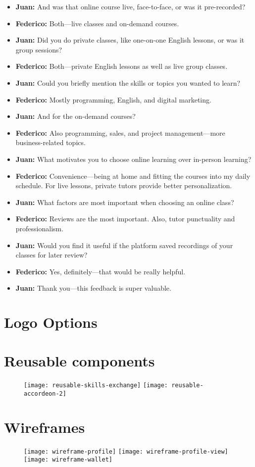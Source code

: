 \begin{enumerate}
\begin{itemize}
        \item \textbf{Juan:} And was that online course live, face-to-face, or was it pre-recorded?
        \item \textbf{Federico:} Both—live classes and on-demand courses.
        \item \textbf{Juan:} Did you do private classes, like one-on-one English lessons, or was it group sessions?
        \item \textbf{Federico:} Both—private English lessons as well as live group classes.
        \item \textbf{Juan:} Could you briefly mention the skills or topics you wanted to learn?
        \item \textbf{Federico:} Mostly programming, English, and digital marketing.
        \item \textbf{Juan:} And for the on-demand courses?
        \item \textbf{Federico:} Also programming, sales, and project management—more business-related topics.
        \item \textbf{Juan:} What motivates you to choose online learning over in-person learning?
        \item \textbf{Federico:} Convenience—being at home and fitting the courses into my daily schedule.
        For live lessons, private tutors provide better personalization.
        \item \textbf{Juan:} What factors are most important when choosing an online class?
        \item \textbf{Federico:} Reviews are the most important.
        Also, tutor punctuality and professionalism.
        \item \textbf{Juan:} Would you find it useful if the platform saved recordings of your classes for later review?
        \item \textbf{Federico:} Yes, definitely—that would be really helpful.
        \item \textbf{Juan:} Thank you—this feedback is super valuable.
    \end{itemize}
\end{enumerate}

\section{Logo Options}\label{sec:logo-options}


\section{Reusable components}\label{sec:reusable-components}
\begin{figure}[h]
    \centering
    \texttt{[image: reusable-skills-exchange]}
    \texttt{[image: reusable-accordeon-2]}
    \label{fig:reusable-components}
\end{figure}
\clearpage
\section{Wireframes}\label{sec:wireframes}
\begin{figure}[h]
    \texttt{[image: wireframe-profile]}
    \texttt{[image: wireframe-profile-view]}
    \texttt{[image: wireframe-wallet]}
    \label{fig:wireframes}
\end{figure}